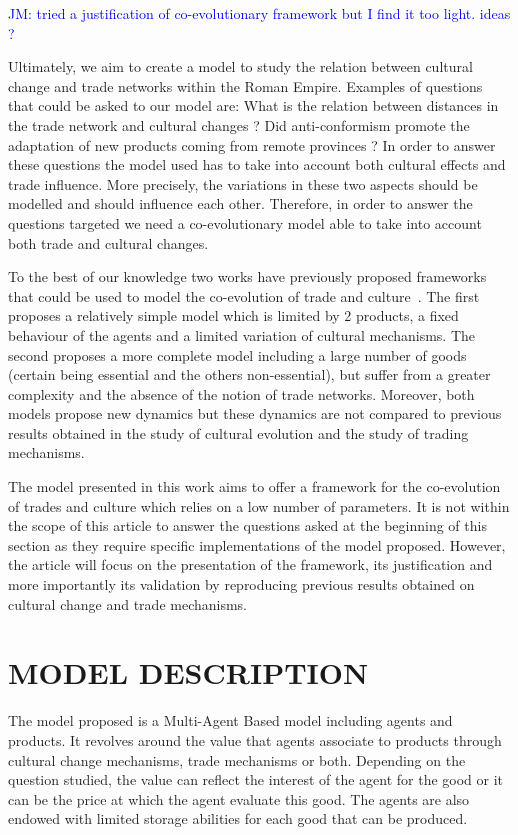\documentclass{wscpaperproc}
\newcommand{\memo}[2]{\textcolor{#1}{#2}}
\newcommand{\jm}[1]{\memo{blue}{JM: #1\\}}
\begin{document}
\jm{tried a justification of co-evolutionary framework but I find it too light. ideas ?}

Ultimately, we aim to create a model to study the relation between cultural change and trade networks within the Roman Empire. Examples of questions that could be asked to our model are: What is the relation between distances in the trade network and cultural changes ? Did anti-conformism promote the adaptation of new products coming from remote provinces ? In order to answer these questions the model used has to take into account both cultural effects and trade influence. More precisely, the variations in these two aspects should be modelled and should influence each other.  Therefore, in order to answer the questions targeted we need a co-evolutionary model able to take into account both trade and cultural changes. 

To the best of our knowledge two works have previously proposed frameworks that could be used to model the co-evolution of trade and culture~\cite{bentley_specialisation_2005,macmillan_agent-based_2008}. The first proposes a relatively simple model which is limited by 2 products, a fixed behaviour of the agents and a limited variation of cultural mechanisms. The second proposes a more complete model including a large number of goods (certain being essential and the others non-essential), but suffer from a greater complexity and the absence of the notion of trade networks. Moreover, both models propose new dynamics but these dynamics are not compared to previous results obtained in the study of cultural evolution and the study of trading mechanisms.

The model presented in this work aims to offer a framework for the co-evolution of trades and culture which relies on a low number of parameters. It is not within the scope of this article to answer the questions asked at the beginning of this section as they require specific implementations of the model proposed. However, the article will focus on the presentation of the framework, its justification and more importantly its validation by reproducing previous results obtained on cultural change and trade mechanisms.



\section{MODEL DESCRIPTION}

The model proposed is a Multi-Agent Based model including agents and products. It revolves around the value that agents associate to products through cultural change mechanisms, trade mechanisms or both. Depending on the question studied, the value can reflect the interest of the agent for the good or it can be the price at which the agent evaluate this good. The agents are also endowed with limited storage abilities for each good that can be produced. 
\end{document}
